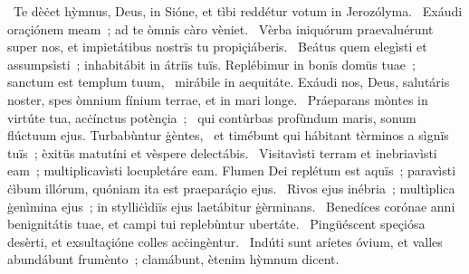\psalmChapterWithInscription{}
{ }
{%
~Te dèċet hỳmnus, Deus, in Sióne, et tìbi reddétur votum in Jerozólyma. 
~Exáudi oraçiónem meam~; ad te òmnis càro vèniet. 
~Vèrba iniquórum praevaluérunt super nos, et impietátibus nostrïs tu propiçiáberis. 
~Beátus quem elegìsti et assumpsìsti~; inhabitábit in átriïs tuïs. Replébimur in bonïs domüs tuae~; sanctum est templum tuum, 
~mirábile in aequitáte. Exáudi nos, Deus, salutáris noster, spes òmnium fínium terrae, et in mari longe. 
~Práeparans mòntes in virtúte tua, acċínctus potènçia~; 
~qui contùrbas profùndum maris, sonum flúctuum ejus. Turbabùntur ġèntes, 
~et timébunt qui hábitant tèrminos a sìgnïs tuïs~; èxitüs matutíni et vèspere delectábis. 
~Visitavìsti terram et inebriavìsti eam~; multiplicavìsti locupletáre eam. Flumen Dei replétum est aquïs~; paravìsti ċìbum illórum, quóniam ita est praeparáçio ejus. 
~Rivos ejus inébria~; multìplica ġenìmina ejus~; in stylliċìdiïs ejus laetábitur ġèrminans. 
~Benedíces corónae anni benignitátis tuae, et campi tui replebùntur ubertáte. 
~Pingüéscent speçiósa desèrti, et exsultaçióne colles acċingèntur. 
~Indúti sunt aríetes óvium, et valles abundábunt frumènto~; clamábunt, ètenim hỳmnum dicent. 
}
